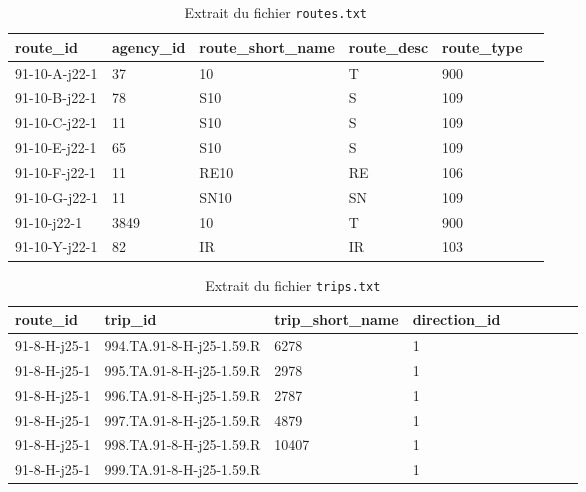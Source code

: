 \begin{itemize}
    \begin{table}[h]
    \caption{Extrait du fichier \texttt{routes.txt}}
    \label{tab:routes}
    \centering
    \begin{tabular}{l l l l l l}
    \toprule
    route\_id & agency\_id & route\_short\_name & route\_desc & route\_type \\
    \midrule
    91-10-A-j22-1 & 37 & 10 & T & 900 \\
    91-10-B-j22-1 & 78 & S10 & S & 109 \\
    91-10-C-j22-1 & 11 & S10 & S & 109 \\
    91-10-E-j22-1 & 65 & S10 & S & 109 \\
    91-10-F-j22-1 & 11 & RE10 & RE & 106 \\
    91-10-G-j22-1 & 11 & SN10 & SN & 109 \\
    91-10-j22-1 & 3849 & 10 & T & 900 \\
    91-10-Y-j22-1 & 82 & IR & IR & 103 \\
    \bottomrule
    \end{tabular}
    \end{table}

    \begin{table}[h]
    \caption{Extrait du fichier \texttt{trips.txt}}
    \label{tab:trips}
    \centering
    \begin{tabular}{l l l l l l l l l}
    \toprule
    route\_id & trip\_id & trip\_short\_name & direction\_id  \\
    \midrule
    91-8-H-j25-1  & 994.TA.91-8-H-j25-1.59.R  & 6278 & 1 \\
    91-8-H-j25-1  & 995.TA.91-8-H-j25-1.59.R  & 2978 & 1 \\
    91-8-H-j25-1  & 996.TA.91-8-H-j25-1.59.R & 2787 & 1 \\
    91-8-H-j25-1  & 997.TA.91-8-H-j25-1.59.R  & 4879 & 1 \\
    91-8-H-j25-1  & 998.TA.91-8-H-j25-1.59.R  & 10407 & 1 \\
    91-8-H-j25-1  & 999.TA.91-8-H-j25-1.59.R  & & 1 & \\
    \bottomrule
    \end{tabular}
    \end{table}


\end{itemize}
